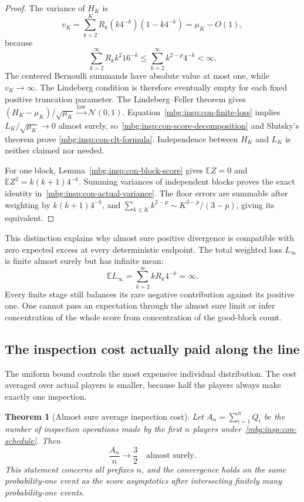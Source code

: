 \documentclass[11pt,letterpaper]{article}
\newtheorem{theorem}{Theorem}[section]
\theoremstyle{definition}
\newcommand{\E}{\mathbb E}
\begin{document}
\begin{proof}
The variance of $H_K$ is
\[
 v_K=\sum_{k=2}^{K}R_k(k4^{-k})(1-k4^{-k})
     =\mu_K-O(1),
\]
because
\[
 \sum_{k=2}^{\infty}R_k k^2 16^{-k}
 \leq\sum_{k=2}^{\infty}k^{2-p}4^{-k}<\infty.
\]
The centered Bernoulli summands have absolute value at most one, while
$v_K\to\infty$.  The Lindeberg condition is therefore eventually empty for
each fixed positive truncation parameter.  The Lindeberg--Feller theorem
gives $(H_K-\mu_K)/\sqrt{\mu_K}\xrightarrow{\mathrm{law}}\mathcal N(0,1)$.
Equation~\eqref{mbg:insp:con-finite-loss} implies $L_K/\sqrt{\mu_K}\to0$ almost
surely, so~\eqref{mbg:insp:con-score-decomposition} and Slutsky's theorem prove
\eqref{mbg:insp:con-clt-formula}.  Independence between $H_K$ and $L_K$ is neither
claimed nor needed.

For one block, Lemma~\ref{mbg:insp:con-block-score} gives
$\E Z=0$ and $\E Z^2=k(k+1)4^{-k}$.  Summing variances of independent
blocks proves the exact identity in~\eqref{mbg:insp:con-actual-variance}.  The floor
errors are summable after weighting by $k(k+1)4^{-k}$, and
$\sum_{k\leq K}k^{2-p}\sim K^{3-p}/(3-p)$, giving its equivalent.
\end{proof}

This distinction explains why almost sure positive divergence is compatible
with zero expected excess at every deterministic endpoint.  The total
weighted loss $L_\infty$ is finite almost surely but has infinite mean:
\[
 \E L_\infty
 =\sum_{k=2}^{\infty}kR_k4^{-k}=\infty.
\]
Every finite stage still balances its rare negative contribution against
its positive one.  One cannot pass an expectation through the almost sure
limit or infer concentration of the whole score from concentration of the
good-block count.

\subsection{The inspection cost actually paid along the line}

The uniform bound controls the most expensive individual distribution.
The cost averaged over actual players is smaller, because half the players
always make exactly one inspection.

\begin{theorem}[Almost sure average inspection cost]
\label{mbg:insp:con-realized-cost}
Let $A_n=\sum_{i=1}^{n}Q_i$ be the number of inspection operations made by
the first $n$ players under~\eqref{mbg:insp:con-schedule}.  Then
\begin{equation}\label{mbg:insp:con-cost-limit}
 \frac{A_n}{n}\longrightarrow\frac32
 \quad\text{almost surely}.
\end{equation}
This statement concerns all prefixes $n$, and the convergence holds on the
same probability-one event as the score asymptotics after intersecting
finitely many probability-one events.
\end{theorem}
\end{document}
